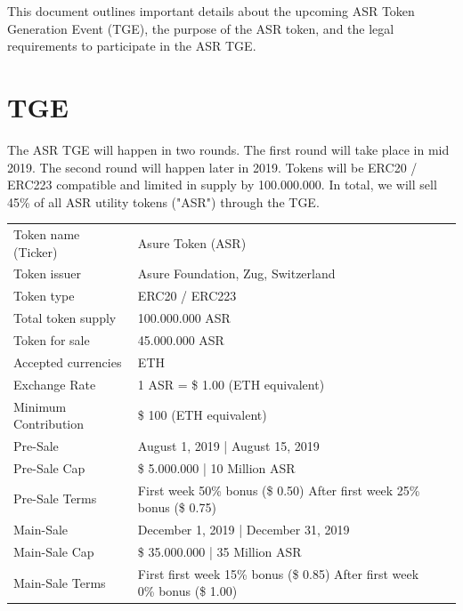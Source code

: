 
This document outlines important details about the upcoming ASR Token Generation Event (TGE), the purpose of the ASR token, and the legal requirements to participate in the ASR TGE.

\section{TGE}
The ASR TGE will happen in two rounds. The first round will take place in mid 2019. The second round will happen later in 2019. Tokens will be ERC20 / ERC223 compatible and limited in supply by 100.000.000. In total, we will sell 45\% of all ASR utility tokens ("ASR") through the TGE.

\begin{table}[H]
\begin{tabular}{lp{}l}
  Token name (Ticker) & Asure Token (ASR) \\  
  Token issuer & Asure Foundation, Zug, Switzerland\\
  Token type & ERC20 / ERC223 \\
  Total token supply & 100.000.000 ASR \\
  Token for sale & 45.000.000 ASR \\
  Accepted currencies & ETH \\
  Exchange Rate & 1 ASR = \$ 1.00 (ETH equivalent) \\
  Minimum Contribution & \$ 100 (ETH equivalent) \\\hline  
 
  Pre-Sale & August 1, 2019 | August 15, 2019 \\
  Pre-Sale Cap & \$ 5.000.000 | 10 Million ASR\\
  Pre-Sale Terms & First week 50\% bonus (\$ 0.50) \newline
                   After first week 25\% bonus (\$ 0.75)\\\hline
  
  Main-Sale & December 1, 2019 | December 31, 2019 \\
  Main-Sale Cap & \$ 35.000.000 | 35 Million ASR\\
  Main-Sale Terms & First first week 15\% bonus (\$ 0.85)\newline
                    After first week 0\% bonus (\$ 1.00)\\\hline


\end{tabular}
\end{table}

